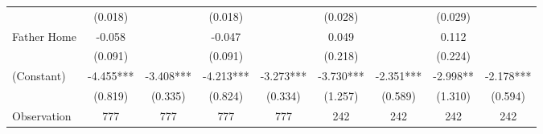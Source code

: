 \begin{tabular}{lcccccccc}
 & (0.018) &  & (0.018) &  & (0.028) &  & (0.029) &  \\
Father Home & -0.058 &  & -0.047 &  & 0.049 &  & 0.112 &  \\
 & (0.091) &  & (0.091) &  & (0.218) &  & (0.224) &  \\
(Constant) & -4.455*** & -3.408*** & -4.213*** & -3.273*** & -3.730*** & -2.351*** & -2.998** & -2.178*** \\
 & (0.819) & (0.335) & (0.824) & (0.334) & (1.257) & (0.589) & (1.310) & (0.594) \\
\midrule 
Observation & 777 & 777 & 777 & 777 & 242 & 242 & 242 & 242 \\
\midrule 
\bottomrule 
\end{tabular}
